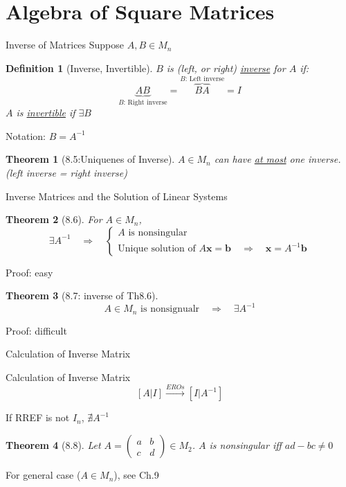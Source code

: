 \documentclass[final]{beamer}
\newtheorem{defn}{Definition}
\newtheorem{thm}{Theorem}
\begin{document}
\section{Algebra of Square Matrices} %
\label{sec:algebra_of_square_matrices}
\begin{frame}[t]{Inverse of Matrices}
	Suppose $A,B\in M_n$
	\begin{defn}
		[Inverse, Invertible]
		$B$ is (left, or right) \uline{inverse} for $A$ if:\[
			\underbrace{AB}_{\text{$B$: Right inverse}}=\overbrace{BA}^{\text{$B$: Left inverse}}=I
		\]
		$A$ is \uline{invertible} if $\exists B$
	\end{defn}
	Notation: $B=A^{-1}$
	\begin{thm}
		[8.5:Uniquenes of Inverse]
		$A\in M_n$ can have \uline{at most} one inverse. (left inverse = right inverse)
	\end{thm}
\end{frame}

\begin{frame}[t]{Inverse Matrices and the Solution of Linear Systems}
	\begin{thm}
		[8.6] For $A\in M_n$,
		\[
			\exists A^{-1} \quad\Rightarrow\quad \begin{cases}
				A \text{ is nonsingular}\\
				\text{Unique solution of } A\mathbf{x}=\mathbf{b} \quad\Rightarrow\quad \mathbf{x}=A^{-1}\mathbf{b}
			\end{cases}
		\]
	\end{thm}
	Proof: easy
	\begin{thm}
		[8.7: inverse of Th8.6] \[
			A\in M_n \text{ is nonsignualr} \quad\Rightarrow\quad \exists A^{-1}
		\]
	\end{thm}
	Proof: difficult
\end{frame}

\begin{frame}[t]{Calculation of Inverse Matrix}
	\begin{block}
		{Calculation of Inverse Matrix}
		\[
			[A\vert I] \xrightarrow{EROs} [I\vert A^{-1}]
		\]
	\end{block}
	If RREF is not $I_n$, $\nexists A^{-1}$
	\begin{thm}
		[8.8] Let $A=\begin{pmatrix}
			a&b\\c&d
		\end{pmatrix} \in M_2$. $A$ is nonsingular iff $ad-bc\neq 0$
	\end{thm}
	For general case ($A\in M_n$), see Ch.9
\end{frame}
\end{document}

